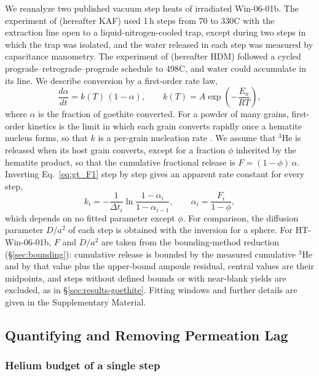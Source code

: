 We reanalyze two published vacuum step heats of irradiated Win-06-01b. The experiment of
\citet{farley2024} (hereafter KAF) used 1\,h steps from 70 to 330\textdegree C with the extraction
line open to a liquid-nitrogen-cooled trap, except during two steps in which the trap was
isolated, and the water released in each step was measured by capacitance manometry. The
experiment of \citet{monteiro2017} (hereafter HDM) followed a cycled prograde--retrograde--prograde
schedule to 498\textdegree C, and water could accumulate in its line. We describe conversion by a
first-order rate law,
\begin{equation}
  \frac{d\alpha}{dt} = k(T)\,(1-\alpha),
  \qquad
  k(T) = A\exp\!\left(-\frac{E_a}{RT}\right),
  \label{eq:gt_F1}
\end{equation}
where $\alpha$ is the fraction of goethite converted. For a powder of many grains, first-order
kinetics is the limit in which each grain converts rapidly once a hematite nucleus forms, so that
$k$ is a per-grain nucleation rate \citep{mampel1940}. We assume that $^3$He is released when its
host grain converts, except for a fraction $\phi$ inherited by the hematite product, so that the
cumulative fractional release is $F = (1-\phi)\,\alpha$. Inverting Eq.~\eqref{eq:gt_F1} step by
step gives an apparent rate constant for every step,
\begin{equation}
  k_i = -\frac{1}{\Delta t_i}\ln\frac{1-\alpha_i}{1-\alpha_{i-1}},
  \qquad \alpha_i = \frac{F_i}{1-\phi},
  \label{eq:gt_stepk}
\end{equation}
which depends on no fitted parameter except $\phi$. For comparison, the diffusion parameter
$D/a^2$ of each step is obtained with the \citet{fechtigkalbitzer1966} inversion for a sphere.
For HT-Win-06-01b, $F$ and $D/a^2$ are taken from the bounding-method reduction
(\S\ref{sec:bounding}): cumulative release is bounded by the measured cumulative $^3$He and by that
value plus the upper-bound ampoule residual, central values are their midpoints, and steps without
defined bounds or with near-blank yields are excluded, as in \S\ref{sec:results-goethite}.
Fitting windows and further details are given in the Supplementary Material.

\subsection{Quantifying and Removing Permeation Lag}\label{sec:theory}

\subsubsection{Helium budget of a single step}\label{sec:budget}

